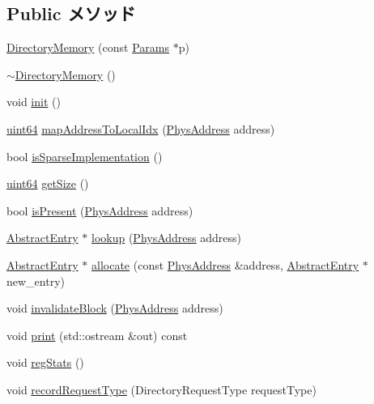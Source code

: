 \subsection*{Public メソッド}
\begin{DoxyCompactItemize}
\item 
\hyperlink{classDirectoryMemory_a49d302369a214b36aed2294da3df6344}{DirectoryMemory} (const \hyperlink{classDirectoryMemory_aafb743d69401c676144ae89b3d302665}{Params} $\ast$p)
\item 
\hyperlink{classDirectoryMemory_a795a78e7307578d71722e1e697abbd28}{$\sim$DirectoryMemory} ()
\item 
void \hyperlink{classDirectoryMemory_a02fd73d861ef2e4aabb38c0c9ff82947}{init} ()
\item 
\hyperlink{TypeDefines_8hh_a29940ae63ec06c9998bba873e25407ad}{uint64} \hyperlink{classDirectoryMemory_a1f5e94201944cc2280763bacdd2434a9}{mapAddressToLocalIdx} (\hyperlink{classAddress}{PhysAddress} address)
\item 
bool \hyperlink{classDirectoryMemory_aadd91d2a549668cda6508e49d0bc1bec}{isSparseImplementation} ()
\item 
\hyperlink{TypeDefines_8hh_a29940ae63ec06c9998bba873e25407ad}{uint64} \hyperlink{classDirectoryMemory_a8e981cbeb9445bf4b68f04489d0ec5e5}{getSize} ()
\item 
bool \hyperlink{classDirectoryMemory_a7b2f16669427e1b3e12d4ce637ebdfe3}{isPresent} (\hyperlink{classAddress}{PhysAddress} address)
\item 
\hyperlink{classAbstractEntry}{AbstractEntry} $\ast$ \hyperlink{classDirectoryMemory_aa41ffa1e9020bc6e333faf3c56a667f1}{lookup} (\hyperlink{classAddress}{PhysAddress} address)
\item 
\hyperlink{classAbstractEntry}{AbstractEntry} $\ast$ \hyperlink{classDirectoryMemory_aee033a35679976b4a82111c30bef7891}{allocate} (const \hyperlink{classAddress}{PhysAddress} \&address, \hyperlink{classAbstractEntry}{AbstractEntry} $\ast$new\_\-entry)
\item 
void \hyperlink{classDirectoryMemory_a6c0a228f895daabbc3860a471a999d5e}{invalidateBlock} (\hyperlink{classAddress}{PhysAddress} address)
\item 
void \hyperlink{classDirectoryMemory_ac55fe386a101fbae38c716067c9966a0}{print} (std::ostream \&out) const 
\item 
void \hyperlink{classDirectoryMemory_a4dc637449366fcdfc4e764cdf12d9b11}{regStats} ()
\item 
void \hyperlink{classDirectoryMemory_ae401a64c076a01d8abf4d4ebce5712f3}{recordRequestType} (DirectoryRequestType requestType)
\end{DoxyCompactItemize}
